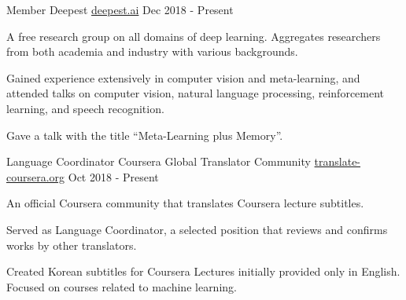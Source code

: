 

\begin{cventries}

  \cventry
    {Member} %
    {Deepest} %
    {\url{deepest.ai}} %
    {Dec 2018 - Present} %
    {
      \begin{cvitems} %
        \item {A free research group on all domains of deep learning. Aggregates researchers from both academia and industry with various backgrounds.}
        \item {Gained experience extensively in computer vision and meta-learning, and attended talks on computer vision, natural language processing, reinforcement learning, and speech recognition.}
        \item {Gave a talk with the title ``Meta-Learning plus Memory''.}
      \end{cvitems}
    }

  \cventry
    {Language Coordinator} %
    {Coursera Global Translator Community} %
    {\url{translate-coursera.org}} %
    {Oct 2018 - Present} %
    {
      \begin{cvitems} %
        \item {An official Coursera community that translates Coursera lecture subtitles.}
        \item {Served as Language Coordinator, a selected position that reviews and confirms works by other translators.}
        \item {Created Korean subtitles for Coursera Lectures initially provided only in English. Focused on courses related to machine learning.}
      \end{cvitems}
    }

\end{cventries}
